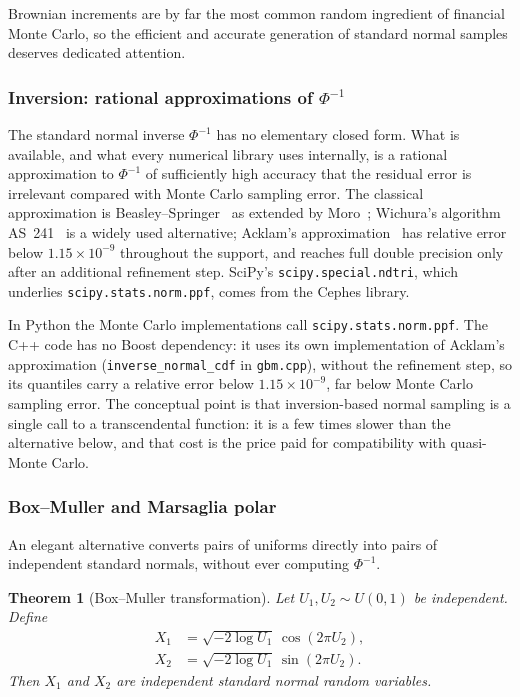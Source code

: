 \documentclass[11pt,a4paper]{article}
\theoremstyle{plain}
\newtheorem{theorem}{Theorem}[section]
\theoremstyle{definition}
\theoremstyle{remark}
\begin{document}
Brownian increments are by far the most common random ingredient of
financial Monte Carlo, so the efficient and accurate generation of
standard normal samples deserves dedicated attention.

\subsubsection{Inversion: rational approximations of $\Phi^{-1}$}

The standard normal inverse $\Phi^{-1}$ has no elementary closed form.
What is available, and what every numerical library uses internally, is
a rational approximation to $\Phi^{-1}$ of sufficiently high accuracy
that the residual error is irrelevant compared with Monte Carlo
sampling error. The classical approximation is
Beasley--Springer~\cite{BeasleySpringer1977} as extended by
Moro~\cite{Moro1995}; Wichura's algorithm AS~241~\cite{Wichura1988} is
a widely used alternative; Acklam's approximation~\cite{Acklam2003}
has relative error below $1.15 \times 10^{-9}$ throughout the support,
and reaches full double precision only after an additional refinement
step. SciPy's \texttt{scipy.special.ndtri}, which underlies
\texttt{scipy.stats.norm.ppf}, comes from the Cephes library.

In Python the Monte Carlo implementations call
\texttt{scipy.stats.norm.ppf}. The C++ code has no Boost dependency: it
uses its own implementation of Acklam's approximation
(\texttt{inverse\_normal\_cdf} in \texttt{gbm.cpp}), without the
refinement step, so its quantiles carry a relative error below
$1.15 \times 10^{-9}$, far below Monte Carlo sampling error. The
conceptual point is that
inversion-based normal sampling is a single call to a transcendental
function: it is a few times slower than the alternative below, and that
cost is the price paid for compatibility with quasi-Monte Carlo.

\subsubsection{Box--Muller and Marsaglia polar}

An elegant alternative converts pairs of uniforms directly into pairs
of independent standard normals, without ever computing $\Phi^{-1}$.

\begin{theorem}[Box--Muller transformation]
\label{thm:box-muller}
Let $U_1, U_2 \sim U(0,1)$ be independent. Define
\begin{align}
\label{eq:box-muller}
X_1 &= \sqrt{-2 \log U_1}\,\cos(2\pi U_2), \\
X_2 &= \sqrt{-2 \log U_1}\,\sin(2\pi U_2).
\end{align}
Then $X_1$ and $X_2$ are independent standard normal random variables.
\end{theorem}
\end{document}
